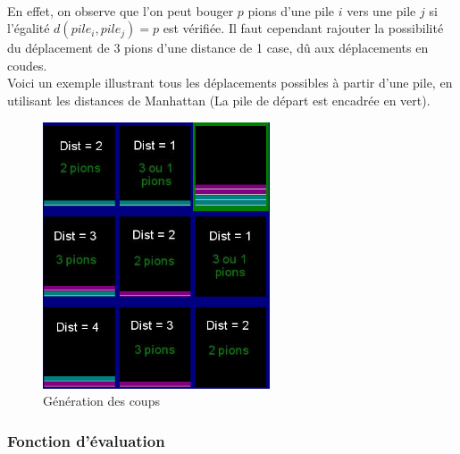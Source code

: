 \documentclass[article, backcover, french, nodocumentinfo]{upmethodology-document}
\begin{document}
				\paragraph{}
					En effet, on observe que l'on peut bouger $p$ pions d'une pile $i$ vers une pile $j$ si l'égalité $d(pile_{i}, pile_{j}) = p$ est vérifiée. Il faut cependant rajouter la possibilité du déplacement de 3 pions d'une distance de 1 case, dû aux déplacements en coudes.\\
					Voici un exemple illustrant tous les déplacements possibles à partir d'une pile, en utilisant les distances de Manhattan (La pile de départ est encadrée en vert).
					\begin{figure}[H]
						\centering
						\includegraphics[width=0.6\textwidth]{figures/GenerationCoup}
						\caption{Génération des coups}
					\end{figure}
			\subsubsection{Fonction d'évaluation}
\end{document}
